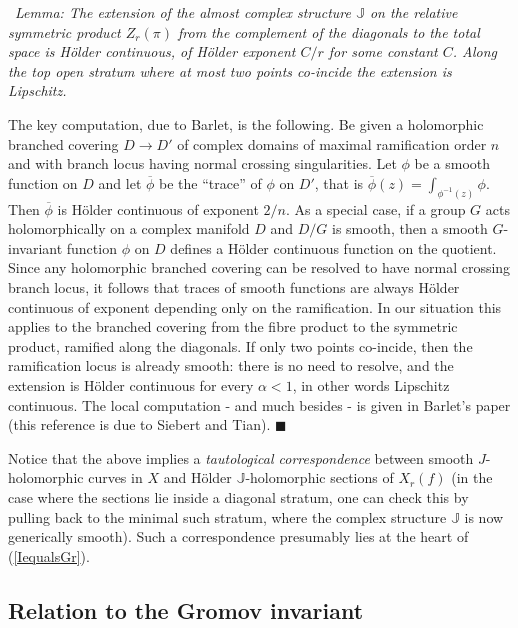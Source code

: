 \documentclass[10pt]{article}
\newcounter{Universal}[section]
\renewcommand{\theUniversal}{\thesection.\arabic{Universal}}
\newenvironment{Italic}{\refstepcounter{Universal} \par \vspace{0.5cm}
\noindent {\bf (\theUniversal)}\ \it}{\par \vspace{0.5cm}}
\newenvironment{Lem}{\begin{Italic}{\sc Lemma: }}{\end{Italic}}
\newenvironment{Pf}{\par \noindent{\sc Proof:} }{\quad $\blacksquare$ \par
\vspace{0.5cm}}
\begin{document}
\begin{Lem} \label{Holder}
The extension of the almost complex structure $\mathbb{J}$ on
the relative symmetric product $Z_r(\pi)$ from the
complement of the diagonals to the total space is H\"older
continuous, of H\"older exponent $C/r$ for some constant $C$.  Along
the top open stratum where at most two points co-incide the extension
is Lipschitz.
\end{Lem}

\begin{Pf}
The key computation, due to Barlet, is the following.  Be given a
holomorphic branched  
covering $D \rightarrow D'$ of  complex domains of maximal ramification order
$n$ and with branch locus having normal crossing singularities.  Let
$\phi$ be a smooth function on $D$ and let $\overline{\phi}$
be the ``trace'' of $\phi$ on $D'$, that is $\overline{\phi}(z) =
\int_{\phi^{-1}(z)} \phi$.  Then $\overline{\phi}$ is H\"older
continuous of exponent $2/n$.  As a special case, if a group $G$ acts
holomorphically 
on a complex manifold $D$ and $D / G$ is smooth, then a smooth
$G$-invariant function $\phi$ on $D$ defines a H\"older continuous
function on the quotient.  Since any holomorphic
branched covering can be resolved to have normal crossing branch
locus, it follows that traces of smooth functions are always H\"older
continuous of exponent depending only on the ramification.  In our
situation this applies to the branched covering from the fibre product
to the symmetric product, ramified along the diagonals.  If only two
points co-incide, then the ramification locus is already smooth: there
is no need to resolve, and the extension is H\"older continuous for
every $\alpha < 1$, in other words Lipschitz continuous.  The local
computation - and much besides - is given in Barlet's paper
\cite{Barlet} (this reference is due to Siebert and Tian). 
\end{Pf}

\noindent Notice that the above implies a \emph{tautological
correspondence} between smooth $J$-holomorphic curves in $X$ and
H\"older $\mathbb{J}$-holomorphic sections of $X_r(f)$ (in
the case where the 
sections lie inside a diagonal stratum, one can check this by pulling
back to the minimal such stratum, where the complex structure
$\mathbb{J}$ is now generically smooth).  Such a correspondence
presumably lies at the heart of (\ref{IequalsGr}).  


\subsection{Relation to the Gromov invariant}
\end{document}
